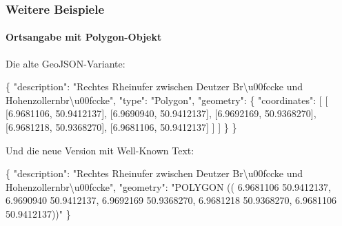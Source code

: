 \documentclass[,a4paper]{article}
\newenvironment{Shaded}{}{}
\newcommand{\DataTypeTok}[1]{\textcolor[rgb]{0.56,0.13,0.00}{{#1}}}
\newcommand{\FloatTok}[1]{\textcolor[rgb]{0.25,0.63,0.44}{{#1}}}
\newcommand{\StringTok}[1]{\textcolor[rgb]{0.25,0.44,0.63}{{#1}}}
\newcommand{\NormalTok}[1]{{#1}}
\begin{document}
\subsubsection{Weitere Beispiele}\label{weitere-beispiele}

\paragraph{Ortsangabe mit
Polygon-Objekt}\label{ortsangabe-mit-polygon-objekt}

Die alte GeoJSON-Variante:

\begin{Shaded}
\begin{Highlighting}[]
\NormalTok{\{}
    \DataTypeTok{"description"}\NormalTok{: }\StringTok{"Rechtes Rheinufer zwischen Deutzer}
\StringTok{        Br\textbackslash{}u00fccke und Hohenzollernbr\textbackslash{}u00fccke"}\NormalTok{,}
    \DataTypeTok{"type"}\NormalTok{: }\StringTok{"Polygon"}\NormalTok{,}
    \DataTypeTok{"geometry"}\NormalTok{: \{}
        \DataTypeTok{"coordinates"}\NormalTok{: [}
            \NormalTok{[}
                \NormalTok{[}\FloatTok{6.9681106}\NormalTok{, }\FloatTok{50.9412137}\NormalTok{],}
                \NormalTok{[}\FloatTok{6.9690940}\NormalTok{, }\FloatTok{50.9412137}\NormalTok{],}
                \NormalTok{[}\FloatTok{6.9692169}\NormalTok{, }\FloatTok{50.9368270}\NormalTok{],}
                \NormalTok{[}\FloatTok{6.9681218}\NormalTok{, }\FloatTok{50.9368270}\NormalTok{],}
                \NormalTok{[}\FloatTok{6.9681106}\NormalTok{, }\FloatTok{50.9412137}\NormalTok{]}
            \NormalTok{]}
        \NormalTok{]}
    \NormalTok{\}}
\NormalTok{\}}
\end{Highlighting}
\end{Shaded}

Und die neue Version mit Well-Known Text:

\begin{Shaded}
\begin{Highlighting}[]
\NormalTok{\{}
    \DataTypeTok{"description"}\NormalTok{: }\StringTok{"Rechtes Rheinufer zwischen Deutzer}
\StringTok{        Br\textbackslash{}u00fccke und Hohenzollernbr\textbackslash{}u00fccke"}\NormalTok{,}
    \DataTypeTok{"geometry"}\NormalTok{: }\StringTok{"POLYGON ((}
\StringTok{                6.9681106 50.9412137,}
\StringTok{                6.9690940 50.9412137,}
\StringTok{                6.9692169 50.9368270,}
\StringTok{                6.9681218 50.9368270,}
\StringTok{                6.9681106 50.9412137))"}
\NormalTok{\}}
\end{Highlighting}
\end{Shaded}
\end{document}
